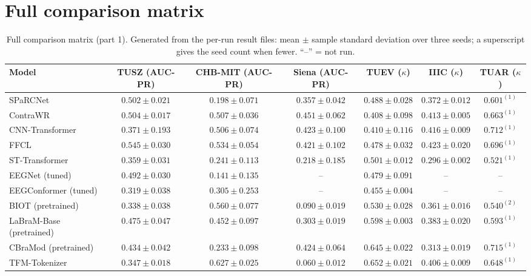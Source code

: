 \appendix
\section{Full comparison matrix}
\label{app:matrix}

\begin{table}[h]
\centering
\scriptsize
\caption{Full comparison matrix (part 1). Generated from the per-run result files: mean $\pm$ sample standard deviation over three seeds; a superscript gives the seed count when fewer. ``--'' = not run.}
\begin{tabular}{lcccccc}
\toprule
Model & TUSZ (AUC-PR) & CHB-MIT (AUC-PR) & Siena (AUC-PR) & TUEV ($\kappa$) & IIIC ($\kappa$) & TUAR ($\kappa$) \\
\midrule
SPaRCNet & $0.502 \pm 0.021$ & $0.198 \pm 0.071$ & $0.357 \pm 0.042$ & $0.488 \pm 0.028$ & $0.372 \pm 0.012$ & $0.601^{(1)}$ \\
ContraWR & $0.504 \pm 0.017$ & $0.507 \pm 0.036$ & $0.451 \pm 0.062$ & $0.408 \pm 0.098$ & $0.413 \pm 0.005$ & $0.663^{(1)}$ \\
CNN-Transformer & $0.371 \pm 0.193$ & $0.506 \pm 0.074$ & $0.423 \pm 0.100$ & $0.410 \pm 0.116$ & $0.416 \pm 0.009$ & $0.712^{(1)}$ \\
FFCL & $0.545 \pm 0.030$ & $0.534 \pm 0.054$ & $0.421 \pm 0.102$ & $0.478 \pm 0.032$ & $0.423 \pm 0.020$ & $0.696^{(1)}$ \\
ST-Transformer & $0.359 \pm 0.031$ & $0.241 \pm 0.113$ & $0.218 \pm 0.185$ & $0.501 \pm 0.012$ & $0.296 \pm 0.002$ & $0.521^{(1)}$ \\
EEGNet (tuned) & $0.492 \pm 0.030$ & $0.141 \pm 0.135$ & -- & $0.479 \pm 0.091$ & -- & -- \\
EEGConformer (tuned) & $0.319 \pm 0.038$ & $0.305 \pm 0.253$ & -- & $0.455 \pm 0.004$ & -- & -- \\
BIOT (pretrained) & $0.338 \pm 0.038$ & $0.560 \pm 0.077$ & $0.090 \pm 0.019$ & $0.530 \pm 0.028$ & $0.361 \pm 0.016$ & $0.540^{(2)}$ \\
LaBraM-Base (pretrained) & $0.475 \pm 0.047$ & $0.452 \pm 0.097$ & $0.303 \pm 0.019$ & $0.598 \pm 0.003$ & $0.383 \pm 0.020$ & $0.593^{(1)}$ \\
CBraMod (pretrained) & $0.434 \pm 0.042$ & $0.233 \pm 0.098$ & $0.424 \pm 0.064$ & $0.645 \pm 0.022$ & $0.313 \pm 0.019$ & $0.715^{(1)}$ \\
TFM-Tokenizer & $0.347 \pm 0.018$ & $0.627 \pm 0.025$ & $0.060 \pm 0.012$ & $0.652 \pm 0.021$ & $0.406 \pm 0.009$ & $0.648^{(1)}$ \\

\end{tabular}
\end{table}

